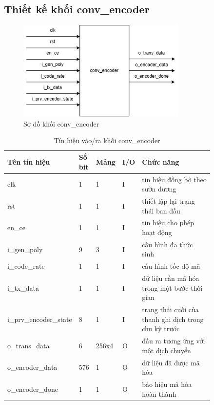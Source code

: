 \documentclass[../DoAn.tex]{subfiles}
\begin{document}
\subsection{Thiết kế khối conv\_encoder}

\begin{figure}[H]
    \centering
    \includegraphics[width=0.75\textwidth, height=0.18\textheight, keepaspectratio]{Hinhve/Chuong 4/conv encoder.png}
    \caption{Sơ đồ khối conv\_encoder}
\end{figure}

\begin{table}[H]
\centering{}
    \caption{Tín hiệu vào/ra khối conv\_encoder}
    \begin{tabular}{|p{0.28\linewidth}|p{0.08\linewidth}|p{0.08\linewidth}|p{0.05\linewidth}|p{0.35\linewidth}|}
        \hline
        \textbf{Tên tín hiệu} & \textbf{Số bit}  & \textbf{Mảng}     & \textbf{I/O}   & \textbf{Chức năng} \\ \hline\hline
        clk  & 1   & 1     & I     & tín hiệu đồng bộ theo sườn dương \\ \hline
        rst   & 1   & 1     & I     & thiết lập lại trạng thái ban đầu\\ \hline
        en\_ce        & 1   & 1     & I     & tín hiệu cho phép hoạt động \\ \hline
        i\_gen\_poly  & 9   & 3     & I     & cấu hình đa thức sinh  \\ \hline
        i\_code\_rate  & 1   & 1     & I     & cấu hình tốc độ mã \\ \hline
        i\_tx\_data  & 1   & 1     & I     & dữ liệu cần mã hóa trong một bước thời gian\\ \hline
        i\_prv\_encoder\_state  & 8   & 1     & I     & trạng thái cuối của thanh ghi dịch trong chu kỳ trước \\ \hline
        o\_trans\_data  & 6   & 256x4     & O     & đầu ra tương ứng với một dịch chuyển \\ \hline
        o\_encoder\_data  & 576   & 1     & O     & dữ liệu đã được mã hóa \\ \hline
        o\_encoder\_done  & 1   & 1     & O     & báo hiệu mã hóa hoàn thành \\ \hline
        \end{tabular}
\end{table}
\end{document}
